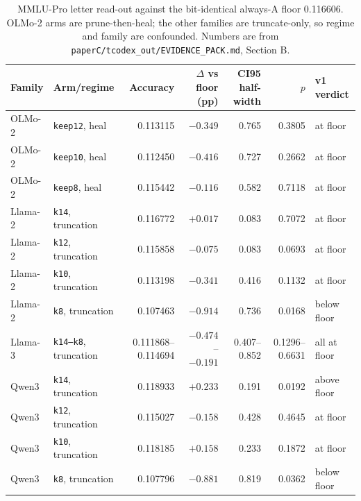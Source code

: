 \begin{table}[t]
\centering
\scriptsize
\setlength{\tabcolsep}{2.6pt}
\begin{tabular}{llrrrrl}
\toprule
Family & Arm/regime & Accuracy & $\Delta$ vs floor (pp) & CI95 half-width & $p$ & v1 verdict \\
\midrule
OLMo-2 & \texttt{keep12}, heal & 0.113115 & $-0.349$ & 0.765 & 0.3805 & at floor \\
OLMo-2 & \texttt{keep10}, heal & 0.112450 & $-0.416$ & 0.727 & 0.2662 & at floor \\
OLMo-2 & \texttt{keep8}, heal & 0.115442 & $-0.116$ & 0.582 & 0.7118 & at floor \\
Llama-2 & \texttt{k14}, truncation & 0.116772 & $+0.017$ & 0.083 & 0.7072 & at floor \\
Llama-2 & \texttt{k12}, truncation & 0.115858 & $-0.075$ & 0.083 & 0.0693 & at floor \\
Llama-2 & \texttt{k10}, truncation & 0.113198 & $-0.341$ & 0.416 & 0.1132 & at floor \\
Llama-2 & \texttt{k8}, truncation & 0.107463 & $-0.914$ & 0.736 & 0.0168 & below floor \\
Llama-3 & \texttt{k14--k8}, truncation & 0.111868--0.114694 & $-0.474$--$-0.191$ & 0.407--0.852 & 0.1296--0.6631 & all at floor \\
Qwen3 & \texttt{k14}, truncation & 0.118933 & $+0.233$ & 0.191 & 0.0192 & above floor \\
Qwen3 & \texttt{k12}, truncation & 0.115027 & $-0.158$ & 0.428 & 0.4645 & at floor \\
Qwen3 & \texttt{k10}, truncation & 0.118185 & $+0.158$ & 0.233 & 0.1872 & at floor \\
Qwen3 & \texttt{k8}, truncation & 0.107796 & $-0.881$ & 0.819 & 0.0362 & below floor \\
\bottomrule
\end{tabular}
\caption{MMLU-Pro letter read-out against the bit-identical always-A floor 0.116606. OLMo-2 arms are prune-then-heal; the other families are truncate-only, so regime and family are confounded. Numbers are from \texttt{paperC/tcodex\_out/EVIDENCE\_PACK.md}, Section B.}
\label{tab:mmlupro}
\end{table}
